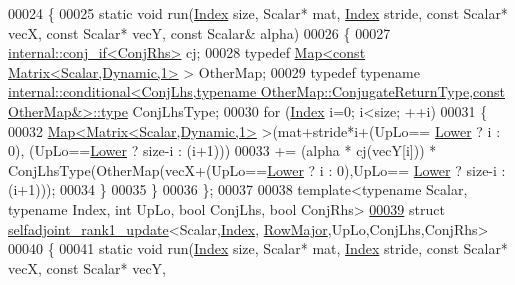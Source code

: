 \begin{DoxyCode}
00024 \{
00025   \textcolor{keyword}{static} \textcolor{keywordtype}{void} run(\hyperlink{namespace_eigen_a62e77e0933482dafde8fe197d9a2cfde}{Index} size, Scalar* mat, \hyperlink{namespace_eigen_a62e77e0933482dafde8fe197d9a2cfde}{Index} stride, \textcolor{keyword}{const} Scalar* vecX, \textcolor{keyword}{const} Scalar* vecY, \textcolor{keyword}{
      const} Scalar& alpha)
00026   \{
00027     \hyperlink{struct_eigen_1_1internal_1_1conj__if}{internal::conj\_if<ConjRhs>} cj;
00028     \textcolor{keyword}{typedef} \hyperlink{group___core___module_class_eigen_1_1_map}{Map<const Matrix<Scalar,Dynamic,1>} > OtherMap;
00029     \textcolor{keyword}{typedef} \textcolor{keyword}{typename} 
      \hyperlink{class_eigen_1_1internal_1_1_tensor_lazy_evaluator_writable}{internal::conditional<ConjLhs,typename OtherMap::ConjugateReturnType,const OtherMap&>::type}
       ConjLhsType;
00030     \textcolor{keywordflow}{for} (\hyperlink{namespace_eigen_a62e77e0933482dafde8fe197d9a2cfde}{Index} i=0; i<size; ++i)
00031     \{
00032       \hyperlink{group___core___module_class_eigen_1_1_map}{Map<Matrix<Scalar,Dynamic,1>} >(mat+stride*i+(UpLo==
      \hyperlink{group__enums_gga39e3366ff5554d731e7dc8bb642f83cda891792b8ed394f7607ab16dd716f60e6}{Lower} ? i : 0), (UpLo==\hyperlink{group__enums_gga39e3366ff5554d731e7dc8bb642f83cda891792b8ed394f7607ab16dd716f60e6}{Lower} ? size-i : (i+1)))
00033           += (alpha * cj(vecY[i])) * ConjLhsType(OtherMap(vecX+(UpLo==\hyperlink{group__enums_gga39e3366ff5554d731e7dc8bb642f83cda891792b8ed394f7607ab16dd716f60e6}{Lower} ? i : 0),UpLo==
      \hyperlink{group__enums_gga39e3366ff5554d731e7dc8bb642f83cda891792b8ed394f7607ab16dd716f60e6}{Lower} ? size-i : (i+1)));
00034     \}
00035   \}
00036 \};
00037 
00038 \textcolor{keyword}{template}<\textcolor{keyword}{typename} Scalar, \textcolor{keyword}{typename} Index, \textcolor{keywordtype}{int} UpLo, \textcolor{keywordtype}{bool} ConjLhs, \textcolor{keywordtype}{bool} ConjRhs>
\hyperlink{struct_eigen_1_1selfadjoint__rank1__update_3_01_scalar_00_01_index_00_01_row_major_00_01_up_lo_03a9dcf0deae11b1da493e4caae5cd21a}{00039} \textcolor{keyword}{struct }\hyperlink{struct_eigen_1_1selfadjoint__rank1__update}{selfadjoint\_rank1\_update}<Scalar,\hyperlink{namespace_eigen_a62e77e0933482dafde8fe197d9a2cfde}{Index},
      \hyperlink{group__enums_ggaacded1a18ae58b0f554751f6cdf9eb13acfcde9cd8677c5f7caf6bd603666aae3}{RowMajor},UpLo,ConjLhs,ConjRhs>
00040 \{
00041   \textcolor{keyword}{static} \textcolor{keywordtype}{void} run(\hyperlink{namespace_eigen_a62e77e0933482dafde8fe197d9a2cfde}{Index} size, Scalar* mat, \hyperlink{namespace_eigen_a62e77e0933482dafde8fe197d9a2cfde}{Index} stride, \textcolor{keyword}{const} Scalar* vecX, \textcolor{keyword}{const} Scalar* vecY, \textcolor{keyword}{
}
\end{DoxyCode}
